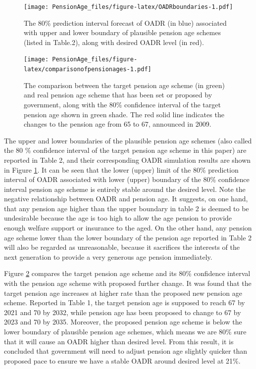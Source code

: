 \documentclass[11pt,a4paper,]{article}
\begin{document}
\begin{figure}
\centering
\texttt{[image: PensionAge\_files/figure-latex/OADRboundaries-1.pdf]}
\caption{\label{fig:OADRboundaries}The 80\% prediction interval forecast of
OADR (in blue) associated with upper and lower boundary of plausible
pension age schemes (listed in Table.2), along with desired OADR level
(in red).}
\end{figure}

\begin{figure}
\centering
\texttt{[image: PensionAge\_files/figure-latex/comparisonofpensionages-1.pdf]}
\caption{\label{fig:comparisonofpensionages}The comparison between the
target pension age scheme (in green) and real pension age scheme that
has been set or proposed by government, along with the 80\% confidence
interval of the target pension age shown in green shade. The red solid
line indicates the changes to the pension age from 65 to 67, announced
in 2009.}
\end{figure}

The upper and lower boundaries of the plausible pension age schemes
(also called the 80 \% confidence interval of the target pension age
scheme in this paper) are reported in Table 2, and their corresponding
OADR simulation results are shown in Figure \ref{fig:OADRboundaries}. It
can be seen that the lower (upper) limit of the 80\% prediction interval
of OADR associated with lower (upper) boundary of the 80\% confidence
interval pension age scheme is entirely stable around the desired level.
Note the negative relationship between OADR and pension age. It
suggests, on one hand, that any pension age higher than the upper
boundary in table 2 is deemed to be undesirable because the age is too
high to allow the age pension to provide enough welfare support or
insurance to the aged. On the other hand, any pension age scheme lower
than the lower boundary of the pension age reported in Table 2 will also
be regarded as unreasonable, because it sacrifices the interests of the
next generation to provide a very generous age pension immediately.

Figure \ref{fig:comparisonofpensionages} compares the target pension age
scheme and its 80\% confidence interval with the pension age scheme with
proposed further change. It was found that the target pension age
increases at higher rate than the proposed new pension age scheme.
Reported in Table 1, the target pension age is supposed to reach 67 by
2021 and 70 by 2032, while pension age has been proposed to change to 67
by 2023 and 70 by 2035. Moreover, the proposed pension age scheme is
below the lower boundary of plausible pension age schemes, which means
we are 80\% sure that it will cause an OADR higher than desired level.
From this result, it is concluded that government will need to adjust
pension age slightly quicker than proposed pace to ensure we have a
stable OADR around desired level at 21\%.
\end{document}
